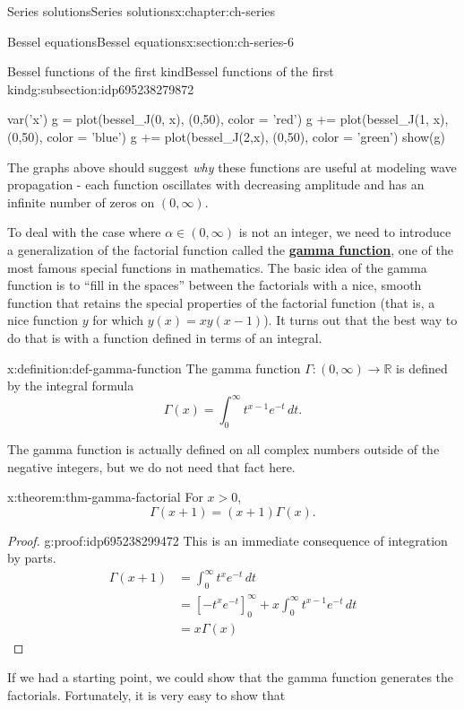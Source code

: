 \documentclass[oneside,10pt,]{book}
\newcommand{\terminology}[1]{\textbf{#1}}
\numberwithin{equation}{section}
\newcommand{\R}{\mathbb{R}}
\numberwithin{equation}{section}
\newcommand{\amp}{&}
\begin{document}
\begin{chapterptx}{Series solutions}{}{Series solutions}{}{}{x:chapter:ch-series}
\begin{sectionptx}{Bessel equations}{}{Bessel equations}{}{}{x:section:ch-series-6}
\begin{subsectionptx}{Bessel functions of the first kind}{}{Bessel functions of the first kind}{}{}{g:subsection:idp695238279872}
\begin{sageinput}
var('x')
g = plot(bessel_J(0, x), (0,50), color = 'red')
g += plot(bessel_J(1, x), (0,50), color = 'blue')
g += plot(bessel_J(2,x), (0,50), color = 'green')
show(g)
\end{sageinput}
The graphs above should suggest \emph{why} these functions are useful at modeling wave propagation - each function oscillates with decreasing amplitude and has an infinite number of zeros on \((0,\infty)\).%
\par
To deal with the case where \(\alpha \in (0,\infty)\) is not an integer, we need to introduce a generalization of the factorial function called the \terminology{\href{https://en.wikipedia.org/wiki/Gamma_function}{gamma function}}, one of the most famous special functions in mathematics. The basic idea of the gamma function is to ``fill in the spaces'' between the factorials with a nice, smooth function that retains the special properties of the factorial function (that is, a nice function \(y\) for which \(y(x) = x y(x-1)\)). It turns out that the best way to do that is with a function defined in terms of an integral.%
\begin{definition}{}{x:definition:def-gamma-function}%
The gamma function \(\Gamma: (0, \infty) \to \R\) is defined by the integral formula%
\begin{equation}
\Gamma(x) = \int_0^\infty t^{x-1} e^{-t} \, dt.\label{x:men:eq-gamma-prop}
\end{equation}
%
\end{definition}
The gamma function is actually defined on all complex numbers outside of the negative integers, but we do not need that fact here.%
\begin{theorem}{}{}{x:theorem:thm-gamma-factorial}%
For \(x > 0\),%
\begin{equation*}
\Gamma(x + 1) = (x + 1) \Gamma(x).
\end{equation*}
%
\end{theorem}
\begin{proof}{}{g:proof:idp695238299472}
This is an immediate consequence of integration by parts.%
\begin{align*}
\Gamma(x + 1) \amp= \int_0^\infty t^{x} e^{-t} \, dt\\
\amp= \left[-t^{x} e^{-t}\right]_0^\infty + x \int_0^\infty t^{x - 1} e^{-t} \, dt\\
\amp= x \Gamma(x)
\end{align*}
%
\end{proof}
If we had a starting point, we could show that the gamma function generates the factorials. Fortunately, it is very easy to show that%

\end{subsectionptx}
\end{sectionptx}
\end{chapterptx}
\end{document}
